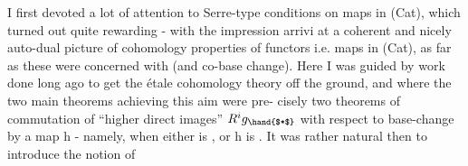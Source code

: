 I first devoted a lot of attention to Serre-type
conditions on maps in (Cat), which turned out quite rewarding - with
the impression  arrivi at a coherent and nicely auto-dual picture of
cohomology properties of functors i.e. maps in (Cat), as far as these
were concerned with  (and \hand{\uline{\textcolor{black}{not}}} co-base change). Here
I was guided by work done long ago to get the étale cohomology theory off
the ground, and where the two main theorems achieving this aim were pre-%
cisely two theorems of commutation of ``higher direct images'' $R^{i}g_{\hand{$*$}}$ with
respect to base-change by a map h - namely,  when either  is \hand{\uline{\textcolor{black}{proper}}},
or h is \hand{\uline{\textcolor{black}{smooth}}}. It was rather natural then to introduce the notion of

